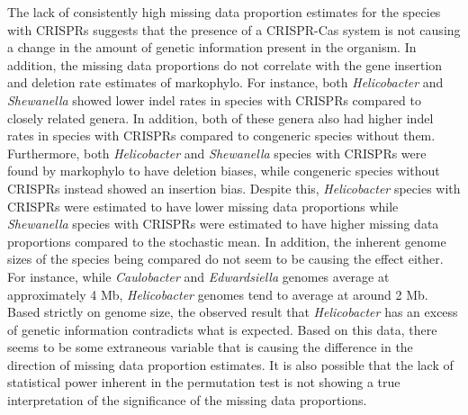 \documentclass[english]{article}
\begin{document}
The lack of consistently high missing data proportion estimates for
the species with CRISPRs suggests that the presence  of a  CRISPR-Cas
system  is not  causing  a  change  in  the  amount of genetic
information present in the organism. In addition, the missing data
proportions do not correlate with the gene insertion and
deletion rate estimates of markophylo. For instance, both
\textit{Helicobacter}
and \textit{Shewanella} showed lower indel rates in species with CRISPRs
compared to closely related genera. In addition, both of these genera
also had higher indel rates in
species with CRISPRs compared to congeneric species without them. 
Furthermore, both \textit{Helicobacter} and \textit{Shewanella} 
species with CRISPRs were
found by markophylo to have deletion biases, while congeneric species
without CRISPRs instead showed an insertion bias. Despite this,
\textit{Helicobacter}
species with CRISPRs were estimated to have lower missing data
proportions while \textit{Shewanella} species with CRISPRs were 
estimated to have higher missing data proportions 
compared to the stochastic mean. In addition, the
inherent genome sizes of the species being compared do not seem to be
causing the effect either. For instance, while \textit{Caulobacter} and
\textit{Edwardsiella} genomes average at approximately 4 Mb,
\textit{Helicobacter}
genomes tend to average at around 2 Mb. Based strictly on genome size,
the observed result that \textit{Helicobacter} has an excess of genetic
information contradicts what is expected. Based on this data, there
seems to be some extraneous variable that is causing the difference in
the direction of missing data proportion estimates. It is also
possible that the lack of statistical power inherent in the
permutation test is not showing a true interpretation of the
significance of the missing data proportions.  
\end{document}
